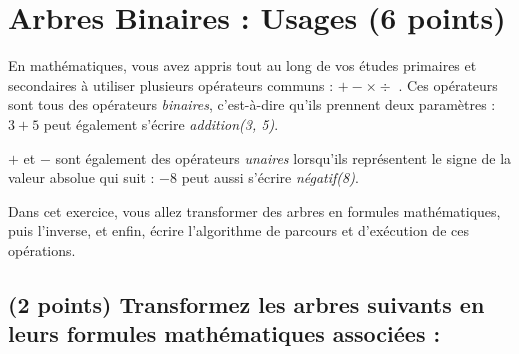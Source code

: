 \documentclass[11pt,a4paper]{article}
\begin{document}
\begin{center}
\end{center}

\clearpage






\section{Arbres Binaires : Usages (6 points)}



\noindent En mathématiques, vous avez appris tout au long de vos études primaires et secondaires à utiliser plusieurs opérateurs communs : \og $ + - \times \div $ \fg{}.
Ces opérateurs sont tous des opérateurs \textit{binaires}, c'est-à-dire qu'ils prennent deux paramètres : \og $ 3 + 5 $ \fg{} peut également s'écrire \textit{addition(3, 5)}.

\noindent \og $ + $ \fg{} et \og $ - $ \fg{} sont également des opérateurs \textit{unaires} lorsqu'ils représentent le signe de la valeur absolue qui suit : \og $ - 8 $ \fg{} peut aussi s'écrire \textit{négatif(8)}.

\medskip

\noindent Dans cet exercice, vous allez transformer des arbres en formules mathématiques, puis l'inverse, et enfin, écrire l'algorithme de parcours et d'exécution de ces opérations.


\subsection{(2 points) Transformez les arbres suivants en leurs formules mathématiques associées : }
\end{document}
